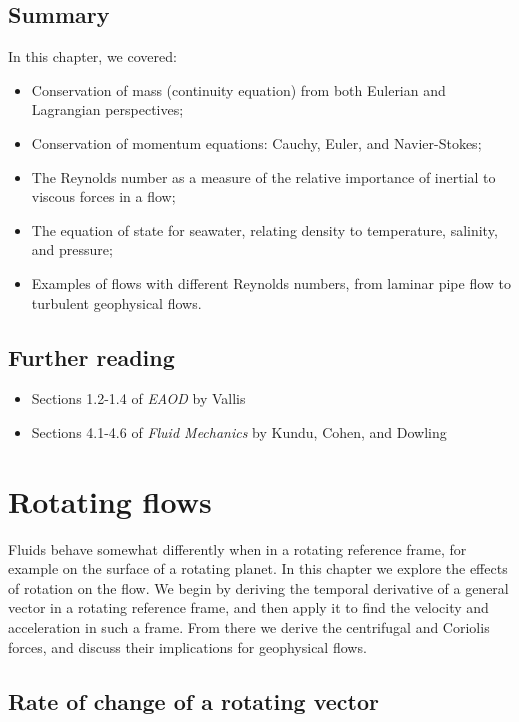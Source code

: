 \documentclass[12pt]{article}
\numberwithin{equation}{section}
\numberwithin{figure}{section}
\numberwithin{table}{section}
\begin{document}
\subsection*{Summary}

In this chapter, we covered:

\begin{itemize}
  \item Conservation of mass (continuity equation) from both Eulerian and
  Lagrangian perspectives;
  \item Conservation of momentum equations: Cauchy, Euler, and Navier-Stokes;
  \item The Reynolds number as a measure of the relative importance of inertial
  to viscous forces in a flow;
  \item The equation of state for seawater, relating density to temperature,
  salinity, and pressure;
  \item Examples of flows with different Reynolds numbers, from laminar pipe
  flow to turbulent geophysical flows.
\end{itemize}

\subsection*{Further reading}

\begin{itemize}
  \item Sections 1.2-1.4 of \textit{EAOD} by Vallis
  \item Sections 4.1-4.6 of \textit{Fluid Mechanics} by Kundu, Cohen, and Dowling
\end{itemize}

\newpage
\section{Rotating flows}

Fluids behave somewhat differently when in a rotating reference frame, for
example on the surface of a rotating planet.
In this chapter we explore the effects of rotation on the flow.
We begin by deriving the temporal derivative of a general vector in a rotating
reference frame, and then apply it to find the velocity and acceleration in such
a frame.
From there we derive the centrifugal and Coriolis forces, and discuss their
implications for geophysical flows.

\subsection{Rate of change of a rotating vector}
\end{document}
